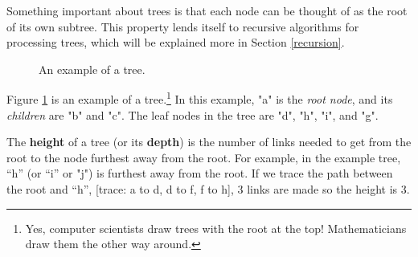 Something important about trees is that each node can be thought of as the root of its own subtree. This property lends itself to recursive algorithms for processing trees, which will be explained more in Section \ref{recursion}.

\begin{figure}
\centering
{}
\caption{An example of a tree.}
\label{fig:tree0}
\end{figure}

Figure \ref{fig:tree0} is an example of a tree.\footnote{Yes, computer scientists draw trees with the root at the top! Mathematicians draw them the other way around.} In this example, "a" is the \textit{root node}, and its \textit{children} are "b" and "c". The leaf nodes in the tree are "d", "h", "i", and "g".


The \textbf{height} of a tree (or its \textbf{depth}) is the number of links needed to get from the root to the node furthest away from the root. For example, in the example tree, “h” (or “i” or "j") is furthest away from the root. If we trace the path between the root and “h”, [trace: a to d, d to f, f to h], 3 links are made so the height is 3.





